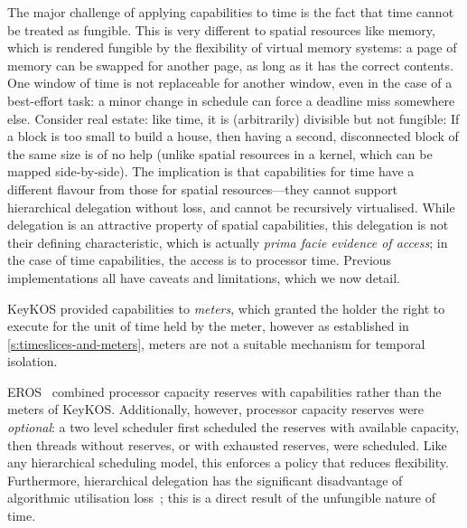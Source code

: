 The major challenge of applying capabilities to time is the fact that time cannot be treated
as fungible. This is very different to spatial resources like memory, which is rendered fungible by the
flexibility of virtual memory systems: a page of memory can be swapped for another page,
as long as it has the correct contents. One window of time is not replaceable for another window, even in the case of a
best-effort task: a minor change in schedule can force a deadline miss somewhere else.
Consider real estate: like time, it is (arbitrarily) divisible but not fungible: If
a block is too small to build a house, then having a second,
disconnected block of the same size is of no help (unlike spatial resources in a kernel, which can
be mapped side-by-side). The implication is
that capabilities for time have a different flavour from those for
spatial resources---they cannot support hierarchical delegation
without loss, and cannot be recursively virtualised. While delegation is an
attractive property of spatial capabilities,
this delegation is not their defining characteristic, which is actually
\emph{prima facie evidence of access}; in the case of time
capabilities, the access is to processor time.
Previous implementations all have caveats and limitations, which we now detail.

KeyKOS provided capabilities to \emph{meters}, which granted the holder
the right to execute for the unit of time held by the meter, however as established in 
\cref{s:timeslices-and-meters}, meters are not a suitable mechanism for temporal isolation.

EROS~\citep{Shapiro_SF_99} combined processor capacity reserves with capabilities rather than the
meters of KeyKOS. Additionally, 
however, processor capacity reserves were \emph{optional}: a two level scheduler first
scheduled the reserves with available capacity, then threads without reserves,
or with exhausted reserves, were scheduled.
Like any hierarchical scheduling model, this enforces a policy that
reduces flexibility.
Furthermore, hierarchical delegation has the significant disadvantage
of algorithmic utilisation loss~\citep{Lackorzynski_WVH_12}; this is a
direct result of the unfungible nature of time.

